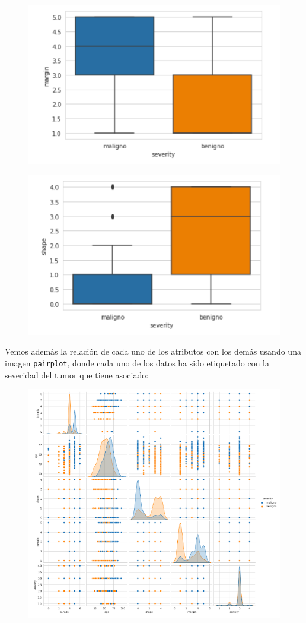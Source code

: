 \documentclass[a4paper,11pt]{book}
\begin{document}
\begin{figure}[H]
	\centering
	\includegraphics[width=0.8\linewidth]{img/box4}
	\caption{}
	\label{fig:box4}
\end{figure}
\begin{figure}[H]
	\centering
	\includegraphics[width=0.6\linewidth]{img/box5}
	\caption{}
	\label{fig:box5}
\end{figure}
Vemos además la relación de cada uno de los atributos con los demás usando una imagen \texttt{pairplot}, donde cada uno de los datos ha sido etiquetado con la severidad del tumor que tiene asociado:
\begin{figure}[H]
	\centering
	\includegraphics[width=1\linewidth]{img/pairplotatributos}
	\caption{}
	\label{fig:pairplotatributos}
\end{figure}
\end{document}
